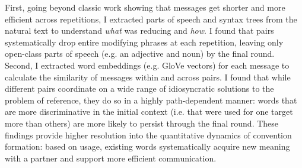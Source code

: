 \documentclass[11pt]{article}
\begin{document}
First, going beyond classic work showing that messages get shorter and more efficient across repetitions, I extracted parts of speech and syntax trees from the natural text to understand \emph{what} was reducing and \emph{how}.
I found that pairs systematically drop entire modifying phrases at each repetition, leaving only open-class parts of speech (e.g. an adjective and noun) by the final round. 
Second, I extracted word embeddings (e.g. GloVe vectors) for each message to calculate the similarity of messages within and across pairs. 
I found that while different pairs coordinate on a wide range of idiosyncratic solutions to the problem of reference, they do so in a highly path-dependent manner: words that are more discriminative in the initial context (i.e. that were used for one target more than others) are more likely to persist through the final round.
These findings provide higher resolution into the quantitative dynamics of convention formation: based on usage, existing words systematically acquire new meaning with a partner and support more efficient communication.

%
\end{document}
